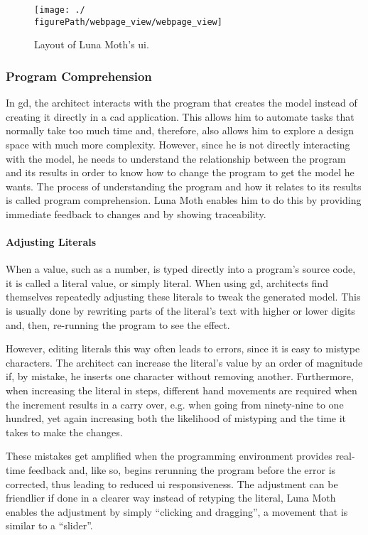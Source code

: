 \begin{figure}
  \centering
  \texttt{[image: ./\\figurePath/webpage\_view/webpage\_view]}
  \caption{Layout of Luna Moth's \gls{ui}.}
  \label{fig:page:view}
\end{figure}


\subsubsection{Program Comprehension}
In \gls{gd}, the architect interacts with the program that creates the model instead of creating it directly in a \gls{cad} application.
This allows him to automate tasks that normally take too much time and, therefore, also allows him to explore a design space with much more complexity.
However, since he is not directly interacting with the model, he needs to understand the relationship between the program and its results in order to know how to change the program to get the model he wants.
The process of understanding the program and how it relates to its results is called program comprehension\cite{rugaber1995program}.
Luna Moth enables him to do this by providing immediate feedback to changes and by showing traceability.


\paragraph{Adjusting Literals}
When a value, such as a number, is typed directly into a program’s source code, it is called a literal value, or simply literal.
When using \gls{gd}, architects find themselves repeatedly adjusting these literals to tweak the generated model.
This is usually done by rewriting parts of the literal’s text with higher or lower digits and, then, re-running the program to see the effect.

However, editing literals this way often leads to errors, since it is easy to mistype characters.
The architect can increase the literal's value by an order of magnitude if, by mistake, he inserts one character without removing another.
Furthermore, when increasing the literal in steps, different hand movements are required when the increment results in a carry over, e.g. when going from ninety-nine to one hundred, yet again increasing both the likelihood of mistyping and the time it takes to make the changes.

These mistakes get amplified when the programming environment provides real-time feedback and, like so, begins rerunning the program before the error is corrected, thus leading to reduced \gls{ui} responsiveness.
The adjustment can be friendlier if done in a clearer way instead of retyping the literal, Luna Moth enables the adjustment by simply ``clicking and dragging'', a movement that is similar to a ``slider''.

